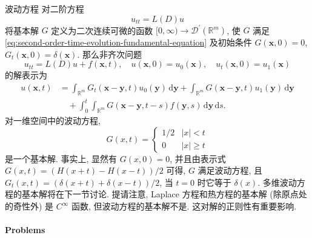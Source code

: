 \begin{Example}{波动方程}
\label{ex:wave-fundamental-solution}
对二阶方程
\begin{equation}\label{eq:second-order-time-evolution-fundamental-equation}
u_{tt}=L(D)u
\end{equation}
将基本解 $G$ 定义为二次连续可微的函数 $[0,\infty)\to\mathcal{D}^{\prime}(\mathbb{R}^m)$, 使 $G$ 满足 \eqref{eq:second-order-time-evolution-fundamental-equation} 及初始条件 $G(\bm{x},0)=0$, $G_t(\bm{x},0)=\delta(\bm{x})$. 那么非齐次问题
\begin{equation}\label{eq:second-order-evolution-inhomogeneous-initial-problem}
u_{tt}=L(D)u+f(\bm{x},t),\quad u(\bm{x},0)=u_0(\bm{x}),\quad u_t(\bm{x},0)=u_1(\bm{x})
\end{equation}
的解表示为
\begin{equation}\label{eq:second-order-evolution-fundamental-solution-formula}
\begin{aligned}
u(\bm{x},t)&=\int_{\mathbb{R}^m}G_t(\bm{x}-\bm{y},t)u_0(\bm{y})\,\mathrm{d}\bm{y}
+\int_{\mathbb{R}^m}G(\bm{x}-\bm{y},t)u_1(\bm{y})\,\mathrm{d}\bm{y}\\
&\quad+\int_0^t\int_{\mathbb{R}^m}G(\bm{x}-\bm{y},t-s)f(\bm{y},s)\,\mathrm{d}\bm{y}\,\mathrm{d}s.
\end{aligned}
\end{equation}
对一维空间中的波动方程,
\begin{equation}\label{eq:wave-one-dimensional-fundamental-solution}
G(x,t)=\begin{cases}1/2&|x|<t\\0&|x|\geq t\end{cases}
\end{equation}
是一个基本解. 事实上, 显然有 $G(x,0)=0$, 并且由表示式 $G(x,t)=(H(x+t)-H(x-t))/2$ 可得, $G$ 满足波动方程, 且 $G_t(x,t)=(\delta(x+t)+\delta(x-t))/2$, 当 $t=0$ 时它等于 $\delta(x)$. 多维波动方程的基本解将在下一节讨论. 提请注意, Laplace 方程和热方程的基本解 (除原点处的奇性外) 是 $C^\infty$ 函数, 但波动方程的基本解不是. 这对解的正则性有重要影响.
\end{Example}

\paragraph*{Problems}

